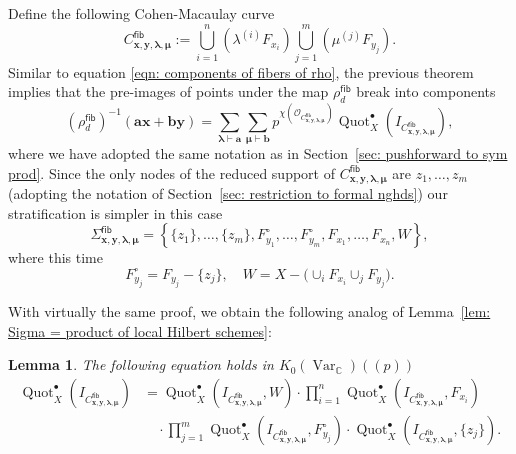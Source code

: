 \documentclass[12pt]{amsart}
\newtheorem{lemma}[theorem]{Lemma}
\theoremstyle{definition}
\newcommand{\CC} {\mathbb{C}}          %
\renewcommand{\O}{\mathcal{O}}
\newcommand{\Hilb}{\operatorname{Hilb}}
\newcommand{\Quot}{\operatorname{Quot}}
\newcommand{\Var}{\operatorname{Var}}
\newcommand{\boldx}{\boldsymbol{x}}
\newcommand{\boldy}{\boldsymbol{y}}
\newcommand{\bolda}{\boldsymbol{a}}
\newcommand{\boldb}{\boldsymbol{b}}
\newcommand{\boldlambda}{\boldsymbol{\lambda }}
\newcommand{\boldmu}{\boldsymbol{\mu }}
\newcommand{\fiber}{\mathsf{fib}}
\begin{document}
Define the following Cohen-Macaulay curve
\[
C_{\boldx, \boldy, \boldlambda, \boldmu}^{\fiber} := \bigcup_{i=1}^{n}\left(\lambda^{(i)}F_{x_{i}} \right)
\bigcup_{j=1}^{m}\left(\mu^{(j)}F_{y_{j}} \right) . 
\]
Similar to equation \eqref{eqn: components of fibers of rho}, the previous theorem implies that the pre-images of points under the map
$\rho^{\fiber}_{d}$ break into components
\[
\left(\rho_{d}^{\fiber} \right)^{-1}(\bolda \boldx +\boldb \boldy ) =
\sum_{\boldlambda \vdash \bolda} \sum_{\boldmu \vdash
\boldb} p^{\chi(\O_{C_{\boldx ,\boldy ,\boldlambda ,\boldmu}^{\fiber}})} \Quot_X^\bullet(I_{C_{\boldx ,\boldy ,\boldlambda ,\boldmu}^{\fiber}}),
\]
where we have adopted the same notation as in Section~\ref{sec:
pushforward to sym prod}. 
Since the only nodes of the reduced support of $C_{\boldx, \boldy, \boldlambda, \boldmu}^{\fiber}$ are $z_{1},\dotsc ,z_{m}$ (adopting
the notation of Section~\ref{sec: restriction to formal nghds}) our
stratification is simpler in this case
\[
\Sigma^{\fiber}_{\boldx, \boldy, \boldlambda, \boldmu} =\left\{ \{z_{1}\},\dotsc ,
\{z_{m}\},F^{\circ}_{y_{1}},\dotsc ,
F^{\circ}_{y_{m}}, F_{x_{1}},\dotsc ,
F_{x_{n}}, W   \right\},
\]
where this time
\[
F^{\circ}_{y_{j}} = F_{y_{j}} - \{z_{j} \}, \quad W = X - \big( \cup_i F_{x_i} \cup_j F_{y_j} \big). 
\]

With virtually the same proof, we obtain the following analog of
Lemma~\ref{lem: Sigma = product of local Hilbert schemes}:
\begin{lemma}\label{lem: Sigmafiber = product of local Hilbert schemes}
The following equation holds in $K_{0}(\Var_{\CC})(\!(p)\!)$
\begin{align*}
\Quot_X^\bullet(I_{C_{\boldx ,\boldy ,\boldlambda ,\boldmu}^{\fiber}}) &=
\Quot_X^{\bullet}(I_{C_{\boldx ,\boldy ,\boldlambda ,\boldmu}^{\fiber}}, W) \cdot \prod_{i=1}^{n}
\Quot_X^{\bullet} \left( I_{C_{\boldx ,\boldy ,\boldlambda ,\boldmu}^{\fiber}},F_{x_{i}} \right) \\
&\quad \cdot \prod_{j=1}^{m} \Quot_X^{\bullet}
\left(I_{C_{\boldx ,\boldy ,\boldlambda ,\boldmu}^{\fiber}}, F^{\circ}_{y_{j}} \right)
\cdot \Quot_X^{\bullet}\left( I_{C_{\boldx ,\boldy ,\boldlambda ,\boldmu}^{\fiber}}, \{z_{j}\} \right). 
\end{align*}
\end{lemma}
\end{document}
